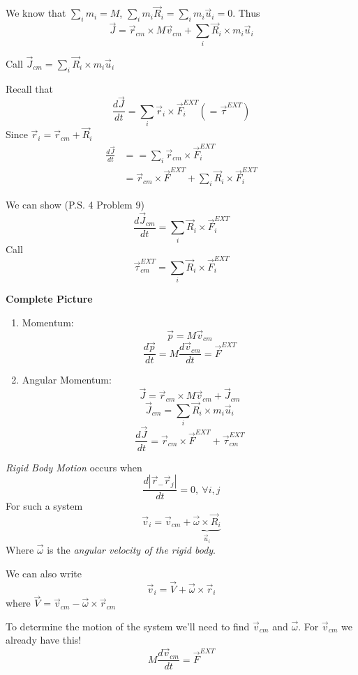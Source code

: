 \documentclass[10pt]{scrartcl}
\begin{document}
We know that $\sum_i m_i = M$, $\sum_i m_i\vec{R}_i = \sum_i m_i \vec{u}_i = 0$. Thus
\[\vec{J} = \vec{r}_{cm} \times M\vec{v}_{cm} + \sum_i\vec{R}_i\times m_i\vec{u}_i\]

Call $\vec{J}_{cm} = \sum_i \vec{R}_i \times m_i\vec{u}_i$

Recall that 
\[\frac{d\vec{J}}{dt} = \sum_i \vec{r}_i \times \vec{F}_i^{EXT} (= \vec{\tau}^{EXT})\]
Since $\vec{r}_i = \vec{r}_{cm} + \vec{R}_i$
\[\begin{aligned} \frac{d\vec{J}}{dt} &= = \sum_i \vec{r}_{cm} \times \vec{F}_i^{EXT}\\
&= \vec{r}_{cm} \times \vec{F}^{EXT} + \sum_i\vec{R}_i\times\vec{F}_i^{EXT}
\end{aligned}
\]

We can show (P.S. 4 Problem 9)
\[\frac{d\vec{J}_{cm}}{dt} = \sum_i\vec{R}_i\times\vec{F}_i^{EXT}\]
Call
\[\vec{\tau}_{cm}^{EXT} = \sum_i\vec{R}_i \times \vec{F}_i^{EXT}\]

\textbf{Complete Picture}
\begin{enumerate}
\item Momentum: \[\vec{p} = M\vec{v}_{cm}\]
\[\frac{d\vec{p}}{dt} =  M\frac{d\vec{v}_{cm}}{dt} = \vec{F}^{EXT}\]
\item Angular Momentum: \[\vec{J} = \vec{r}_{cm} \times M\vec{v}_{cm} + \vec{J}_{cm}\]
\[\vec{J}_{cm} = \sum_i\vec{R}_i \times m_i\vec{u}_i\]
\[\frac{d\vec{J}}{dt} = \vec{r}_{cm} \times \vec{F}^{EXT} + \vec{\tau}_{cm}^{EXT}\]
\end{enumerate}












\begin{definition}
\emph{Rigid Body Motion} occurs when 
\[\frac{d|\vec{r}_- \vec{r}_j|}{dt} = 0,~ \forall i,j\]
For such a system
\[\vec{v}_i = \vec{v}_{cm} + \underbrace{\vec{\omega}\times\vec{R}_i}_{\vec{u}_i}\]	
Where $\vec{\omega}$ is the \emph{angular velocity of the rigid body}.

We can also write 
\[\vec{v}_i = \vec{V} + \vec{\omega}\times\vec{r}_i\]
where 
$\vec{V} = \vec{v}_{cm} - \vec{\omega}\times\vec{r}_{cm}$
\end{definition}

To determine the motion of the system we'll need to find $\vec{v}_{cm}$ and $\vec{\omega}$. For $\vec{v}_{cm}$ we already have this!
\begin{equation}M\frac{d\vec{v}_{cm}}{dt} = \vec{F}^{EXT}\end{equation}
\end{document}
